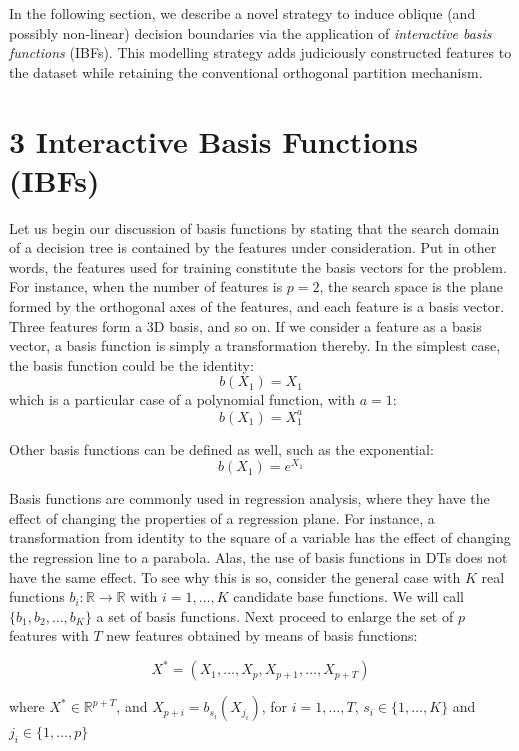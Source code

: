 \documentclass[]{elsarticle} %
\begin{document}
In the following section, we describe a novel strategy to induce oblique
(and possibly non-linear) decision boundaries via the application of
\emph{interactive basis functions} (IBFs). This modelling strategy adds
judiciously constructed features to the dataset while retaining the
conventional orthogonal partition mechanism.

\section{3 Interactive Basis Functions
(IBFs)}\label{interactive-basis-functions-ibfs}

Let us begin our discussion of basis functions by stating that the
search domain of a decision tree is contained by the features under
consideration. Put in other words, the features used for training
constitute the basis vectors for the problem. For instance, when the
number of features is \(p=2\), the search space is the plane formed by
the orthogonal axes of the features, and each feature is a basis vector.
Three features form a 3D basis, and so on. If we consider a feature as a
basis vector, a basis function is simply a transformation thereby. In
the simplest case, the basis function could be the identity: \[
b(X_1) = X_1
\] which is a particular case of a polynomial function, with \(a=1\): \[
b(X_1) = X_1^a
\]

Other basis functions can be defined as well, such as the exponential:
\[
b(X_1) = e^{X_1}
\]

Basis functions are commonly used in regression analysis, where they
have the effect of changing the properties of a regression plane. For
instance, a transformation from identity to the square of a variable has
the effect of changing the regression line to a parabola. Alas, the use
of basis functions in DTs does not have the same effect. To see why this
is so, consider the general case with \(K\) real functions
\(b_{i}:\mathbb{R}\rightarrow\mathbb{R}\) with \(i=1,\dots,K\) candidate
base functions. We will call \(\{b_1,b_2,\dots, b_K\}\) a set of basis
functions. Next proceed to enlarge the set of \(p\) features with \(T\)
new features obtained by means of basis functions:

\[
X^{\ast }=\left( X_{1},\dots,X_{p},X_{p+1},\dots ,X_{p+T} \right)
\]

where \(X^{\ast }\in \mathbb{R}^{p+T}\), and
\(X_{p+i}=b_{s_i}( X_{j_i})\), for \(i=1,\dots ,T\),
\(s_i\in \{1,\dots,K\}\) and \(j_i\in\{1,\dots,p\}\)
\end{document}
